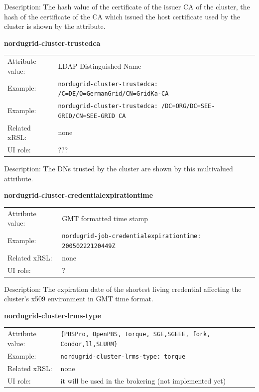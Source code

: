 \documentclass{article}
\begin{document}
Description: The hash value of the certificate of the issuer CA of the cluster, 
the hash of the certificate of the CA which issued the host certificate 
used by the cluster is shown by the attribute.


  \hspace*{0.5cm}
  \begin{shaded}
    \textbf{nordugrid-cluster-trustedca}
  \end{shaded}
  \begin{tabular}{lp{10cm}}  
    Attribute value:& LDAP Distinguished Name\\
    Example:& \verb#nordugrid-cluster-trustedca: /C=DE/O=GermanGrid/CN=GridKa-CA#\\
    Example:& \verb#nordugrid-cluster-trustedca: /DC=ORG/DC=SEE-GRID/CN=SEE-GRID CA#\\
    Related xRSL:& none\\
    UI role:& ???\\
  \end{tabular}

Description: The DNs trusted by the cluster are shown by this
multivalued attribute.


  \hspace*{0.5cm}
  \begin{shaded}
    \textbf{nordugrid-cluster-credentialexpirationtime}
  \end{shaded}
  \begin{tabular}{lp{10cm}}
    Attribute value:& GMT formatted time stamp\\
    Example:& \verb#nordugrid-job-credentialexpirationtime: 20050222120449Z#\\
    Related xRSL:& none\\
    UI role:& ?\\
  \end{tabular}

Description: The expiration date of the shortest living credential affecting
the cluster's x509 environment in GMT time format.


  \hspace*{0.5cm}
  \begin{shaded}
    \textbf{nordugrid-cluster-lrms-type}
  \end{shaded}
  \begin{tabular}{lp{10cm}}
    Attribute value:& \verb#{PBSPro, OpenPBS, torque, SGE,SGEEE, fork, Condor,ll,SLURM}#\\
    Example:& \verb#nordugrid-cluster-lrms-type: torque#\\
    Related xRSL:& none\\
    UI role:& it will be used in the brokering (not implemented yet)\\
  \end{tabular}
\end{document}
